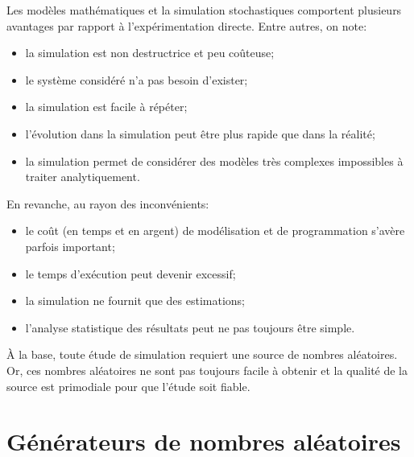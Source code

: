 Les modèles mathématiques et la simulation stochastiques comportent
plusieurs avantages par rapport à l'expérimentation directe. Entre
autres, on note:
\begin{itemize}
\item la simulation est non destructrice et peu coûteuse;
\item le système considéré n'a pas besoin d'exister;
\item la simulation est facile à répéter;
\item l'évolution dans la simulation peut être plus rapide que dans la
  réalité;
\item la simulation permet de considérer des modèles très complexes
  impossibles à traiter analytiquement.
\end{itemize}
En revanche, au rayon des inconvénients:
\begin{itemize}
\item le coût (en temps et en argent) de modélisation et de
  programmation s'avère parfois important;
\item le temps d'exécution peut devenir excessif;
\item la simulation ne fournit que des estimations;
\item l'analyse statistique des résultats peut ne pas toujours être
  simple.
\end{itemize}

À la base, toute étude de simulation requiert une source de nombres
aléatoires. Or, ces nombres aléatoires ne sont pas toujours facile à
obtenir et la qualité de la source est primodiale pour que l'étude
soit fiable.



\section{Générateurs de nombres aléatoires}
\label{sec:generation:generateurs}


